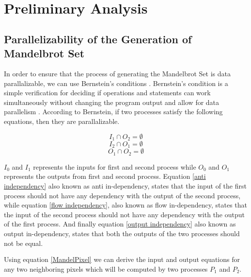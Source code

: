\documentclass[conference]{IEEEtran}
\begin{document}
	
	
	
	
	
	
	
	
	\section{Preliminary Analysis}
	
			\subsection{Parallelizability of the Generation of Mandelbrot Set}
			
			In order to ensure that the process of generating the Mandelbrot Set is data parallalizable, we can use Bernstein’s conditions \cite{bernstein1996analysis}. Bernstein's condition is a simple verification for deciding if operations and statements can work simultaneously without changing the program output and allow for data parallelism \cite{Feautrier2011}. According to Bernstein, if two processes satisfy the following equations, then they are parallalizable.
			
			\begin{equation}
				I_1 \cap O_2 = \emptyset\label{anti independency}
			\end{equation}
			\begin{equation}
				I_2 \cap O_1 = \emptyset \label{flow independency}
			\end{equation}
			\begin{equation}
				O_1 \cap O_2 = \emptyset \label{output independency}
			\end{equation}
			
			$I_0$ and $I_1$ represents the inputs for first and second process while  $O_0$ and $O_1$ represents the outputs from first and second process. Equation \ref{anti independency} also known as anti in-dependency, states that the input of the first process should not have any dependency with the output of the second process, while equation \ref{flow independency}, also known as flow in-dependency, states that the input of the second process should not have any dependency with the output of the first process. And finally equation \ref{output independency} also known as output in-dependency, states that both the outputs of the two processes should not be equal.
			
			Using equation \ref{MandelPixel} we can derive the input and output equations for any two neighboring pixels which will be computed by two processes $P_{1}$ and $P_{2}$.
			
\end{document}
